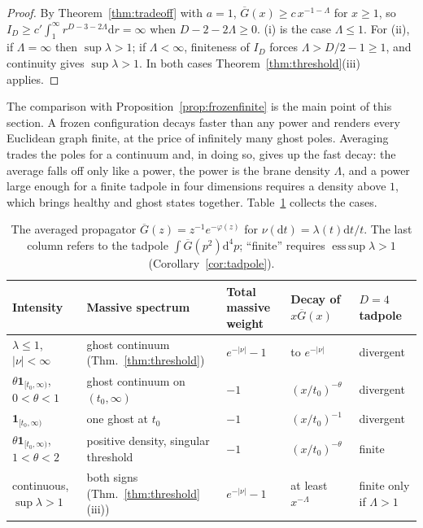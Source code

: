 \documentclass[aps,prd,twocolumn,superscriptaddress,nofootinbib,longbibliography,floatfix,amsmath,amssymb,10pt]{revtex4-2}
\theoremstyle{definition}
\theoremstyle{remark}
\newcommand{\Gbar}{\overline{G}}
\newcommand{\dd}{\mathrm{d}}
\DeclareMathOperator*{\esssup}{ess\,sup}
\begin{document}
\begin{proof}
By Theorem~\ref{thm:tradeoff} with $a=1$, $\Gbar(x)\ge c\,x^{-1-\Lambda}$
for $x\ge1$, so $I_D\ge c'\int_1^\infty r^{D-3-2\Lambda}\dd r=\infty$ when
$D-2-2\Lambda\ge0$. (i) is the case $\Lambda\le1$. For (ii), if
$\Lambda=\infty$ then $\sup\lambda>1$; if $\Lambda<\infty$, finiteness of
$I_D$ forces $\Lambda>D/2-1\ge1$, and continuity gives $\sup\lambda>1$. In
both cases Theorem~\ref{thm:threshold}(iii) applies.
\end{proof}

The comparison with Proposition~\ref{prop:frozenfinite} is the main point of
this section. A frozen configuration decays faster than any power and
renders every Euclidean graph finite, at the price of infinitely many ghost
poles. Averaging trades the poles for a continuum and, in doing so, gives up
the fast decay: the average falls off only like a power, the power is the
brane density $\Lambda$, and a power large enough for a finite tadpole in
four dimensions requires a density above $1$, which brings healthy and ghost
states together. Table~\ref{tab:summary} collects the cases.

\begin{table}[t]
\caption{The averaged propagator $\Gbar(z)=z^{-1}e^{-\varphi(z)}$ for
$\nu(\dd t)=\lambda(t)\dd t/t$. The last column refers to the tadpole
$\int\Gbar(p^2)\dd^4p$; ``finite'' requires $\esssup\lambda>1$
(Corollary~\ref{cor:tadpole}).}
\label{tab:summary}
\begin{ruledtabular}
\begin{tabular}{lllll}
Intensity & Massive spectrum & Total massive weight & Decay of $x\Gbar(x)$ & $D=4$ tadpole\\
\hline
$\lambda\le1$, $|\nu|<\infty$ & ghost continuum (Thm.~\ref{thm:threshold}) & $e^{-|\nu|}-1$ & to $e^{-|\nu|}$ & divergent\\
$\theta\mathbf 1_{[t_0,\infty)}$, $0<\theta<1$ & ghost continuum on $(t_0,\infty)$ & $-1$ & $(x/t_0)^{-\theta}$ & divergent\\
$\mathbf 1_{[t_0,\infty)}$ & one ghost at $t_0$ & $-1$ & $(x/t_0)^{-1}$ & divergent\\
$\theta\mathbf 1_{[t_0,\infty)}$, $1<\theta<2$ & positive density, singular threshold & $-1$ & $(x/t_0)^{-\theta}$ & finite\\
continuous, $\sup\lambda>1$ & both signs (Thm.~\ref{thm:threshold}(iii)) & $e^{-|\nu|}-1$ & at least $x^{-\Lambda}$ & finite only if $\Lambda>1$\\
\end{tabular}
\end{ruledtabular}
\end{table}
\end{document}
